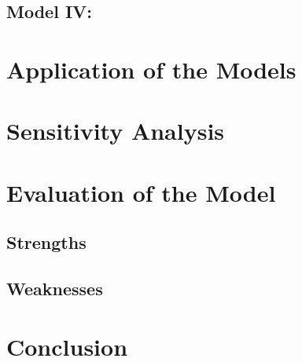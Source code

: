 \documentclass{HZNUMCM}
\begin{document}
      \subsection{Model IV: }
  \section{Application of the Models}

  \section{Sensitivity Analysis}

  \section{Evaluation of the Model}
    \subsection{Strengths}
    \subsection{Weaknesses}

  \section{Conclusion}


  
\end{document}
